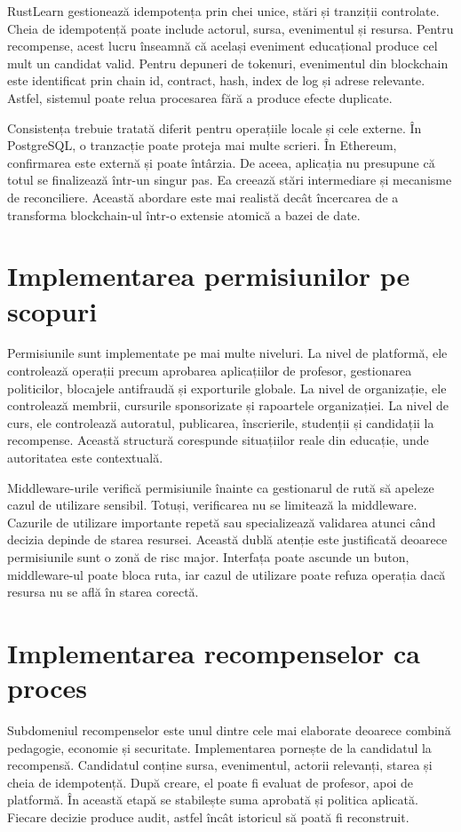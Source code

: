 RustLearn gestionează idempotența prin chei unice, stări și tranziții controlate. Cheia de idempotență poate include actorul, sursa, evenimentul și resursa. Pentru recompense, acest lucru înseamnă că același eveniment educațional produce cel mult un candidat valid. Pentru depuneri de tokenuri, evenimentul din blockchain este identificat prin chain id, contract, hash, index de log și adrese relevante. Astfel, sistemul poate relua procesarea fără a produce efecte duplicate.

Consistența trebuie tratată diferit pentru operațiile locale și cele externe. În PostgreSQL, o tranzacție poate proteja mai multe scrieri. În Ethereum, confirmarea este externă și poate întârzia. De aceea, aplicația nu presupune că totul se finalizează într-un singur pas. Ea creează stări intermediare și mecanisme de reconciliere. Această abordare este mai realistă decât încercarea de a transforma blockchain-ul într-o extensie atomică a bazei de date.

\section{Implementarea permisiunilor pe scopuri}
Permisiunile sunt implementate pe mai multe niveluri. La nivel de platformă, ele controlează operații precum aprobarea aplicațiilor de profesor, gestionarea politicilor, blocajele antifraudă și exporturile globale. La nivel de organizație, ele controlează membrii, cursurile sponsorizate și rapoartele organizației. La nivel de curs, ele controlează autoratul, publicarea, înscrierile, studenții și candidații la recompense. Această structură corespunde situațiilor reale din educație, unde autoritatea este contextuală.

Middleware-urile verifică permisiunile înainte ca gestionarul de rută să apeleze cazul de utilizare sensibil. Totuși, verificarea nu se limitează la middleware. Cazurile de utilizare importante repetă sau specializează validarea atunci când decizia depinde de starea resursei. Această dublă atenție este justificată deoarece permisiunile sunt o zonă de risc major. Interfața poate ascunde un buton, middleware-ul poate bloca ruta, iar cazul de utilizare poate refuza operația dacă resursa nu se află în starea corectă.

\section{Implementarea recompenselor ca proces}
Subdomeniul recompenselor este unul dintre cele mai elaborate deoarece combină pedagogie, economie și securitate. Implementarea pornește de la candidatul la recompensă. Candidatul conține sursa, evenimentul, actorii relevanți, starea și cheia de idempotență. După creare, el poate fi evaluat de profesor, apoi de platformă. În această etapă se stabilește suma aprobată și politica aplicată. Fiecare decizie produce audit, astfel încât istoricul să poată fi reconstruit.


